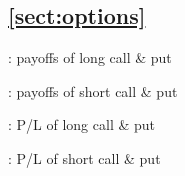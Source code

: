 \subsection*{\cref{sect:options}}
\item {}: payoffs of long call \& put
\item {}: payoffs of short call \& put
\item {}: P/L of long call \& put
\item {}: P/L of short call \& put

